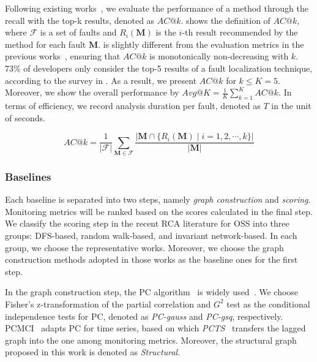 Following existing works~\cite{Wang:2018,Meng:2020,Yu:2021}, we evaluate the performance of a method through the recall with the top-k results, denoted as $AC@k$.
 shows the definition of $AC@k$, where $\mathcal{F}$ is a set of faults and $R_{i}(\mathbf{M})$ is the $i$-th result recommended by the method for each fault $\mathbf{M}$.
 is slightly different from the evaluation metrics in the previous works~\cite{Wang:2018,Meng:2020,Yu:2021}, ensuring that $AC@k$ is monotonically non-decreasing with $k$.
73\% of developers only consider the top-5 results of a fault localization technique, according to the survey in \cite{Kochhar:2016}.
As a result, we present $AC@k$ for $k \le K = 5$.
Moreover, we show the overall performance by $Avg@K = \frac{1}{K}\sum_{k=1}^{K} AC@k$.
In terms of efficiency, we record analysis duration per fault, denoted as $T$ in the unit of seconds.

\begin{equation}\label{eqn:exp:ac-k}
	AC@k = \frac{1}{|\mathcal{F}|}\sum_{\mathbf{M} \in \mathcal{F}} \frac{|\mathbf{M} \cap \{R_{i}(\mathbf{M}) \mid i = 1, 2, \cdots, k\} |}{\lvert\mathbf{M}\rvert}
\end{equation}

\subsubsection{Baselines}

Each baseline is separated into two steps, namely \textit{graph construction} and \textit{scoring}.
Monitoring metrics will be ranked based on the scores calculated in the final step.
We classify the scoring step in the recent RCA literature for OSS into three groups: DFS-based, random walk-based, and invariant network-based.
In each group, we choose the representative works.
Moreover, we choose the graph construction methods adopted in those works as the baseline ones for the first step.

In the graph construction step, the PC algorithm~\cite{Kalisch:2012} is widely used~\cite{Chen:2014,Lin:2018,Wang:2018,Ma:2020}.
We choose Fisher's z-transformation of the partial correlation and $G^{2}$ test as the conditional independence tests for PC, denoted as \textit{PC-gauss} and \textit{PC-gsq}, respectively.
PCMCI~\cite{Runge:2019} adapts PC for time series, based on which \textit{PCTS}~\cite{Meng:2020} transfers the lagged graph into the one among monitoring metrics.
Moreover, the structural graph proposed in this work is denoted as \textit{Structural}.


